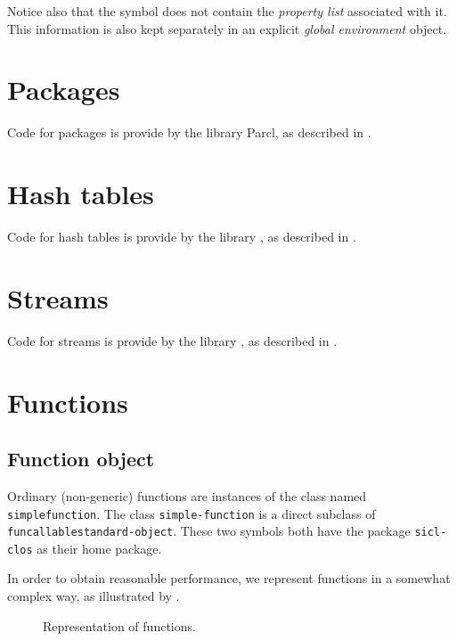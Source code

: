 Notice also that the symbol does not contain the \emph{property list}
associated with it.  This information is also kept separately in an
explicit \emph{global environment} object.

\section{Packages}

Code for packages is provide by the library Parcl, as described in
.

\section{Hash tables}

Code for hash tables is provide by the library \salmagundi{}, as
described in .

\section{Streams}

Code for streams is provide by the library \cyclosis{}, as described
in .

\section{Functions}
\label{sec-data-representation-functions}

\subsection{Function object}

Ordinary (non-generic) \sysname{} functions are instances of the class
named \texttt{simple\-function}.  The class \texttt{simple-function}
is a direct subclass of \texttt{funcallable\-standard-object}.  These
two symbols both have the package \texttt{sicl-clos} as their home
package.

In order to obtain reasonable performance, we represent functions in a
somewhat complex way, as illustrated by
.

\begin{figure}
\begin{center}
\end{center}
\caption{\label{fig-function-representation}
Representation of functions.}
\end{figure}

